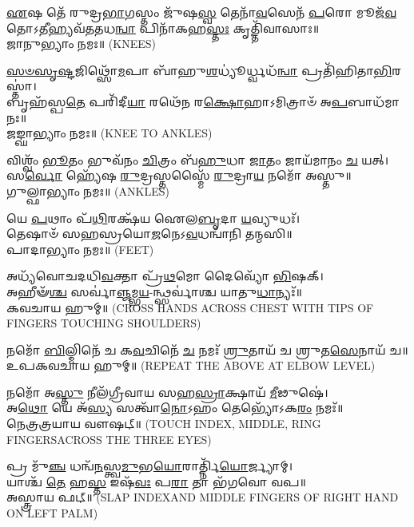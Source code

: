 \-\ul{𑌏}\-𑌷 𑌤𑍇᳴ 𑌰𑍁𑌦𑍍𑌰\-\ul{𑌭𑌾}\-𑌗𑌸𑍍𑌤𑌂 𑌜𑍁᳴𑌷\-\ul{𑌸𑍍𑌵} 𑌤𑍇𑌨𑌾᳴\-\ul{𑌵}\-𑌸𑍇𑌨᳴ \ul{𑌪}\-𑌰𑍋 𑌮𑍂𑌜᳴\-\ul{𑌵}\-𑌤𑍋𑌽\-\ul{𑌤𑍀}\-\-𑌹𑍍𑌯𑌵᳴𑌤𑌤𑌧\-\ul{𑌨𑍍𑌵𑌾} 𑌪𑌿𑌨𑌾᳴𑌕𑌹\-\ul{𑌸𑍍𑌤𑌃} 𑌕𑍃𑌤𑍍𑌤𑌿᳴𑌵𑌾𑌸𑌾𑌃॥\\
𑌜𑌾𑌨𑍁𑌭𑍍𑌯𑌾𑌂 𑌨𑌮𑌃॥ {\scriptsize (KNEES)}

\-\ul{𑌸}\-\-\ul{𑍞}\-\-\ul{𑌸𑍃}\-\-\ul{𑌷𑍍𑌟}\-𑌜𑌿𑌥𑍍𑌸𑍋᳴\-\ul{𑌮}\-𑌪𑌾 𑌬𑌾᳴𑌹𑍁\-\ul{𑌶}\-𑌧𑍍𑌯𑍂॑𑌰𑍍𑌧𑍍𑌵𑌧᳴\-\ul{𑌨𑍍𑌵𑌾} 𑌪𑍍𑌰𑌤𑌿᳴𑌹𑌿𑌤𑌾\-\ul{𑌭𑌿}\-𑌰𑌸𑍍𑌤𑌾॑।\\
𑌬𑍃𑌹᳴𑌸𑍍𑌪\-\ul{𑌤𑍇} 𑌪𑌰𑌿᳴𑌦𑍀\-\ul{𑌯𑌾} 𑌰𑌥𑍇᳴𑌨 𑌰\-\ul{𑌕𑍍𑌷𑍋}\-𑌹𑌾𑌽𑌮𑌿𑌤𑍍𑌰𑌾𑍞᳴ 𑌅\-\ul{𑌪}\-𑌬𑌾𑌧᳴𑌮𑌾𑌨𑌃॥\\
𑌜𑌙𑍍𑌘𑌾𑌭𑍍𑌯𑌾𑌂 𑌨𑌮𑌃॥ {\scriptsize (KNEE TO ANKLES)}

𑌵𑌿𑌶𑍍𑌵𑌂᳴ \ul{𑌭𑍂}\-𑌤𑌂 𑌭𑍁𑌵᳴𑌨𑌂 \ul{𑌚𑌿}\-𑌤𑍍𑌰𑌂 𑌬᳴\-\ul{𑌹𑍁}\-𑌧𑌾 \ul{𑌜𑌾}\-𑌤𑌂 𑌜𑌾𑌯᳴𑌮𑌾𑌨𑌂 \ul{𑌚} 𑌯𑌤𑍍।\\
𑌸\-\ul{𑌰𑍍𑌵𑍋} 𑌹𑍍𑌯𑍇᳴𑌷 \ul{𑌰𑍁}\-𑌦𑍍𑌰𑌸𑍍𑌤𑌸𑍍𑌮𑍈᳴ \ul{𑌰𑍁}\-𑌦𑍍𑌰𑌾\-\ul{𑌯} 𑌨𑌮𑍋᳴ 𑌅𑌸𑍍𑌤𑍁॥\\
𑌗𑍁𑌲𑍍𑌫𑌾𑌭𑍍𑌯𑌾𑌂 𑌨𑌮𑌃॥ {\scriptsize (ANKLES)}

𑌯𑍇 \ul{𑌪}\-𑌥𑌾𑌂 𑌪᳴\-\ul{𑌥𑌿}\-𑌰𑌕𑍍𑌷᳴𑌯 𑌐𑌲\-\ul{𑌬𑍃}\-𑌦𑌾 \ul{𑌯}\-𑌵𑍍𑌯𑍁𑌧𑌃᳴।\\
𑌤𑍇𑌷𑌾𑍞᳴ 𑌸𑌹𑌸𑍍𑌰𑌯𑍋\-\ul{𑌜}\-𑌨𑍇𑌽\-\ul{𑌵}\-𑌧𑌨𑍍𑌵𑌾᳴𑌨𑌿 𑌤𑌨𑍍𑌮𑌸𑌿॥ \\
𑌪𑌾𑌦𑌾𑌭𑍍𑌯𑌾𑌂 𑌨𑌮𑌃॥ {\scriptsize (FEET)}


𑌅𑌧𑍍𑌯᳴𑌵𑍋𑌚𑌦𑌧𑌿\-\ul{𑌵}\-𑌕𑍍𑌤𑌾 𑌪𑍍𑌰᳴\-\ul{𑌥}\-𑌮𑍋 𑌦𑍈𑌵𑍍𑌯𑍋᳴ \ul{𑌭𑌿}\-𑌷𑌕𑍍।\\
𑌅𑌹𑍀𑍟᳴\-\ul{𑌶𑍍𑌚} 𑌸𑌰𑍍𑌵𑌾॑\-\ul{𑌞𑍍𑌜}\-𑌮𑍍𑌭\-\ul{𑌯}\--𑌨𑍍𑌥𑍍𑌸𑌰𑍍𑌵𑌾॑𑌶𑍍𑌚 𑌯𑌾𑌤𑍁\-\ul{𑌧𑌾}\-𑌨𑍍𑌯𑌃᳴॥\\
𑌕𑌵𑌚𑌾𑌯 𑌹𑍁𑌮𑍍॥ {\scriptsize (CROSS HANDS ACROSS CHEST WITH TIPS OF FINGERS TOUCHING SHOULDERS)}


𑌨𑌮𑍋᳴ \ul{𑌬𑌿}\-𑌲𑍍𑌮𑌿𑌨𑍇᳴ 𑌚 𑌕\-\ul{𑌵}\-𑌚𑌿𑌨𑍇᳴ \ul{𑌚} 𑌨𑌮𑌃᳴ \ul{𑌶𑍍𑌰𑍁}\-𑌤𑌾𑌯᳴ 𑌚 𑌶𑍍𑌰𑍁𑌤\-\ul{𑌸𑍇}\-𑌨𑌾𑌯᳴ 𑌚॥\\
𑌉𑌪𑌕𑌵𑌚𑌾𑌯 𑌹𑍁𑌮𑍍॥ {\scriptsize (REPEAT THE ABOVE AT ELBOW LEVEL)}

𑌨𑌮𑍋᳴ 𑌅\-\ul{𑌸𑍍𑌤𑍁} 𑌨𑍀𑌲᳴𑌗𑍍𑌰𑍀𑌵𑌾𑌯 𑌸𑌹\-\ul{𑌸𑍍𑌰𑌾}\-𑌕𑍍𑌷𑌾𑌯᳴ \ul{𑌮𑍀}\-𑌢𑍁𑌷𑍇॑। \\
𑌅\-\ul{𑌥𑍋} 𑌯𑍇 𑌅᳴\-\ul{𑌸𑍍𑌯} 𑌸𑌤𑍍𑌵𑌾᳴\-\ul{𑌨𑍋}\-𑌽𑌹𑌂 𑌤𑍇𑌭𑍍𑌯𑍋᳴𑌽𑌕\-\ul{𑌰𑌂} 𑌨𑌮𑌃᳴॥ \\
𑌨𑍇𑌤𑍍𑌰𑌤𑍍𑌰𑌯𑌾𑌯 𑌵𑍗𑌷𑌟𑍍॥ {\scriptsize (TOUCH INDEX, MIDDLE, RING FINGERSACROSS THE THREE EYES)}


𑌪𑍍𑌰 𑌮𑍁᳴\-\ul{𑌞𑍍𑌚} 𑌧𑌨𑍍𑌵᳴\-\ul{𑌨}\-𑌸𑍍𑌤𑍍𑌵\-\ul{𑌮𑍁}\-𑌭\-\ul{𑌯𑍋}\-𑌰𑌾𑌰𑍍𑌤𑍍𑌨𑌿᳴\-\ul{𑌯𑍋}\-𑌰𑍍𑌜𑍍𑌯𑌾𑌮𑍍।\\
𑌯𑌾𑌶𑍍𑌚᳴ \ul{𑌤𑍇} 𑌹\-\ul{𑌸𑍍𑌤} 𑌇𑌷᳴\-\ul{𑌵𑌃} 𑌪\-\ul{𑌰𑌾} 𑌤𑌾 𑌭᳴𑌗𑌵𑍋 𑌵𑌪॥\\ 
𑌅𑌸𑍍𑌤𑍍𑌰𑌾𑌯 𑌫𑌟𑍍॥ {\scriptsize (SLAP INDEXAND MIDDLE FINGERS OF RIGHT HAND ON LEFT PALM)}

